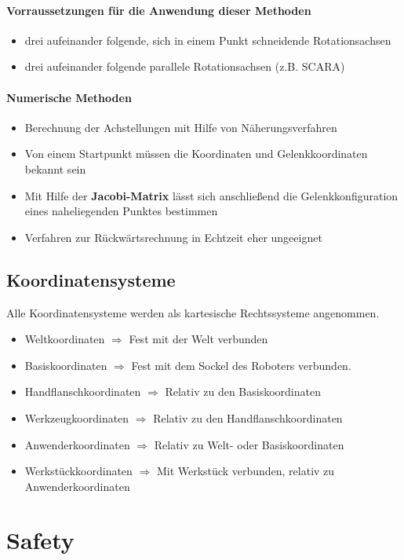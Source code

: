 \paragraph{Vorraussetzungen für die Anwendung dieser Methoden}
\begin{itemize}
	\item drei aufeinander folgende, sich in einem Punkt schneidende Rotationsachsen
	\item drei aufeinander folgende parallele Rotationsachsen (z.B. SCARA)
\end{itemize}
\paragraph{Numerische Methoden}
\begin{itemize}
	\item Berechnung der Achstellungen mit Hilfe von Näherungsverfahren
	\item Von einem Startpunkt müssen die Koordinaten und Gelenkkoordinaten bekannt sein
	\item Mit Hilfe der \textbf{Jacobi-Matrix} lässt sich anschließend die Gelenkkonfiguration eines naheliegenden Punktes bestimmen
	\item Verfahren zur Rückwärtsrechnung in Echtzeit eher ungeeignet
\end{itemize}
\subsection{Koordinatensysteme}
Alle Koordinatensysteme werden als kartesische Rechtssysteme angenommen.
\begin{itemize}
	\item Weltkoordinaten $\Rightarrow$ Fest mit der Welt verbunden
	\item Basiskoordinaten $\Rightarrow$ Fest mit dem Sockel des Roboters verbunden.
	\item Handflanschkoordinaten $\Rightarrow$ Relativ zu den Basiskoordinaten
	\item Werkzeugkoordinaten $\Rightarrow$ Relativ zu den Handflanschkoordinaten
	\item Anwenderkoordinaten $\Rightarrow$ Relativ zu Welt- oder Basiskoordinaten
	\item Werkstückkoordinaten $\Rightarrow$ Mit Werkstück verbunden, relativ zu Anwenderkoordinaten
\end{itemize}
\section{Safety}
